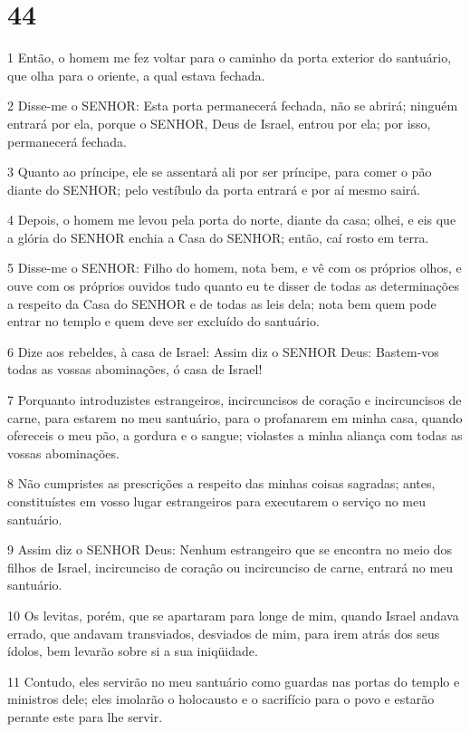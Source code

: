 \chapter{44}

\par 1 Então, o homem me fez voltar para o caminho da porta exterior do santuário, que olha para o oriente, a qual estava fechada.
\par 2 Disse-me o SENHOR: Esta porta permanecerá fechada, não se abrirá; ninguém entrará por ela, porque o SENHOR, Deus de Israel, entrou por ela; por isso, permanecerá fechada.
\par 3 Quanto ao príncipe, ele se assentará ali por ser príncipe, para comer o pão diante do SENHOR; pelo vestíbulo da porta entrará e por aí mesmo sairá.
\par 4 Depois, o homem me levou pela porta do norte, diante da casa; olhei, e eis que a glória do SENHOR enchia a Casa do SENHOR; então, caí rosto em terra.
\par 5 Disse-me o SENHOR: Filho do homem, nota bem, e vê com os próprios olhos, e ouve com os próprios ouvidos tudo quanto eu te disser de todas as determinações a respeito da Casa do SENHOR e de todas as leis dela; nota bem quem pode entrar no templo e quem deve ser excluído do santuário.
\par 6 Dize aos rebeldes, à casa de Israel: Assim diz o SENHOR Deus: Bastem-vos todas as vossas abominações, ó casa de Israel!
\par 7 Porquanto introduzistes estrangeiros, incircuncisos de coração e incircuncisos de carne, para estarem no meu santuário, para o profanarem em minha casa, quando ofereceis o meu pão, a gordura e o sangue; violastes a minha aliança com todas as vossas abominações.
\par 8 Não cumpristes as prescrições a respeito das minhas coisas sagradas; antes, constituístes em vosso lugar estrangeiros para executarem o serviço no meu santuário.
\par 9 Assim diz o SENHOR Deus: Nenhum estrangeiro que se encontra no meio dos filhos de Israel, incircunciso de coração ou incircunciso de carne, entrará no meu santuário.
\par 10 Os levitas, porém, que se apartaram para longe de mim, quando Israel andava errado, que andavam transviados, desviados de mim, para irem atrás dos seus ídolos, bem levarão sobre si a sua iniqüidade.
\par 11 Contudo, eles servirão no meu santuário como guardas nas portas do templo e ministros dele; eles imolarão o holocausto e o sacrifício para o povo e estarão perante este para lhe servir.
